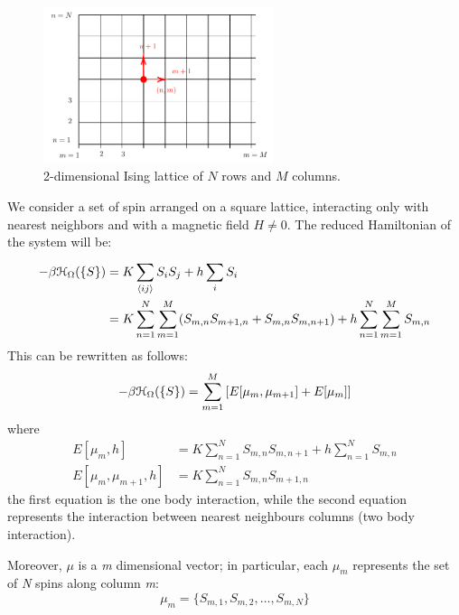 \documentclass[../main/main.tex]{subfiles}
\begin{document}
\begin{figure}[h!]
\centering
\includegraphics[width=0.6\textwidth]{../lessons/9_image/4.pdf}
\caption{\label{fig:9_4} 2-dimensional Ising lattice of \(N\) rows and \(M\) columns.}
\end{figure}

We consider a set of spin arranged on a square lattice, interacting only with nearest neighbors and with a magnetic field \(H  \neq 0 \).  The reduced Hamiltonian of the system will be:
\begin{equation*}
\begin{split}
  -\beta \mathcal{H}_ \Omega  ( \{ S \}  ) &= K \sum_{\expval{ij} }^{} S_i S_j + h \sum_{i}^{} S_i  \\
  & = K \sum_{n=1}^{N} \sum_{m=1}^{M} (S_{m,n} S_{m+1,n}+S_{m,n}S_{m,n+1}) + h \sum_{n=1}^{N} \sum_{m=1}^{M} S_{m,n}
\end{split}
\end{equation*}
This can be rewritten as follows:
\begin{equation}
  -\beta \mathcal{H}_ \Omega  ( \{ S \}  ) = \sum_{m=1}^{M} \qty[E[\mu _m, \mu _{m+1}] + E[\mu _m]]
\end{equation}
where 
\begin{subequations}
\begin{align}
E [ \mu _m,h] &= K \sum_{n=1}^{N} S_{m,n} S_{m,n+1} + h \sum_{n=1}^{N} S_{m,n} \\
  E [\mu _m, \mu _{m+1},h] & = K \sum_{n=1}^{N} S_{m,n} S_{m+1,n}
\end{align}
\end{subequations}
the first equation is the one body interaction, while the second equation represents the interaction between nearest neighbours columns (two body interaction).

Moreover, \( \mu  \)  is a \emph{m} dimensional vector; in particular, each \( \mu _m \) represents the set of \emph{N} spins along column \emph{m}:
\begin{equation}
  \mu _m = \{ S_{m,1}, S_{m,2}, \dots, S_{m,N} \}
  \label{eq:9_1}
\end{equation}
\end{document}

